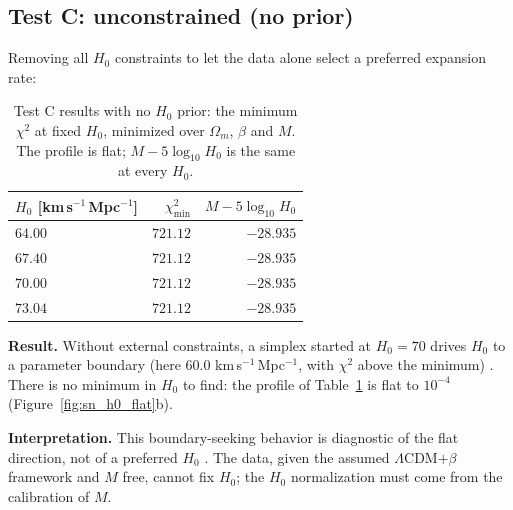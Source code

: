 \subsection{Test C: unconstrained (no prior)}
Removing all $H_0$ constraints to let the data alone select a preferred expansion rate:
\begin{table}[htbp]\centering\small
\caption[Test C: no $H_0$ prior]{Test C results with no $H_0$ prior: the minimum $\chi^2$ at fixed $H_0$, minimized over $\Omega_m$, $\beta$ and $M$. The
profile is flat; $M-5\log_{10}H_0$ is the same at every $H_0$. \calc}\label{tab:dsv_testC}
\begin{tabular}{lrr}\toprule
$H_0$ [km\,s$^{-1}$\,Mpc$^{-1}$] & $\chi^2_{\min}$ & $M-5\log_{10}H_0$\\\midrule
$64.00$ & $721.12$ & $-28.935$\\
$67.40$ & $721.12$ & $-28.935$\\
$70.00$ & $721.12$ & $-28.935$\\
$73.04$ & $721.12$ & $-28.935$\\\bottomrule
\end{tabular}
\end{table}
\textbf{Result.} Without external constraints, a simplex started at $H_0=70$ drives $H_0$ to a parameter boundary (here $60.0$ km\,s$^{-1}$\,Mpc$^{-1}$,
with $\chi^2$ above the minimum) \calc. There is no minimum in $H_0$ to find: the profile of Table~\ref{tab:dsv_testC} is flat to $10^{-4}$
(Figure~\ref{fig:sn_h0_flat}b).

\textbf{Interpretation.} This boundary-seeking behavior is diagnostic of the flat direction, not of a preferred $H_0$ \derived. The data, given the
assumed $\Lambda$CDM$+\beta$ framework and $M$ free, cannot fix $H_0$; the $H_0$ normalization must come from the calibration of $M$.

